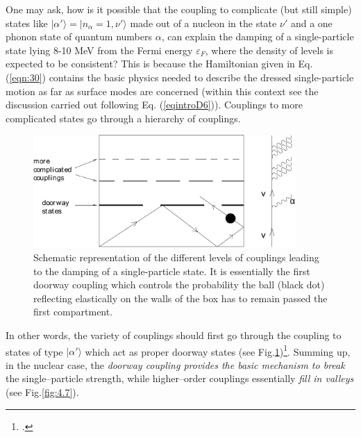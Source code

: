 One may ask, how  is it possible that the coupling to complicate (but still simple) states like $|\alpha'\rangle = |n_\alpha = 1,\nu'\rangle$ made out of a nucleon in the state $\nu'$ and a one phonon state of quantum numbers $\alpha$, can explain the  damping of a single-particle state lying 8-10 MeV from the Fermi energy $\varepsilon_F$, where the density of levels  is expected to be consistent? This is because the Hamiltonian given in Eq. (\ref{eqn:30}) contains  the basic physics needed to describe the dressed single-particle motion as far as surface modes are concerned (within this context see the discussion carried out following Eq. (\ref{eqintroD6})). Couplings to more complicated states  go through a hierarchy of couplings.
\begin{figure}[h!]
\centerline {
\includegraphics*[width=10cm]{introduccion/figs/figintroD6}
}
\caption{Schematic representation of the different levels of couplings leading to the damping of a single-particle state. It is essentially the first doorway coupling which controls the probability the ball (black dot) reflecting elastically on the walls of the box has to remain passed the first compartment.}
\label{fig:4.6}
\end{figure}
In other words, the variety of couplings  should first go  through the coupling to states of type $|\alpha'\rangle$ which act as proper doorway states (see Fig.\ref{fig:4.6})\footnote{\cite{Feshbach:58}.}. Summing up, in  the nuclear case, the {\it doorway coupling provides the basic mechanism to break}  the single--particle strength, while higher--order couplings essentially  {\it fill in valleys} (see Fig.\ref{fig:4.7}).

